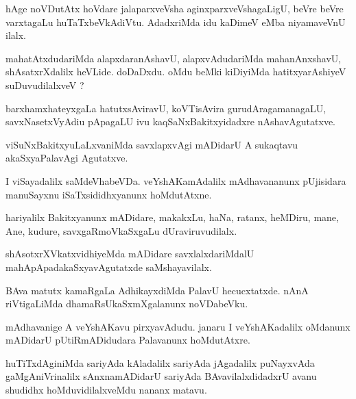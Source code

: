 \documentclass{article}
\begin{document}
\begin{mn}%
hAge noVDutAtx hoVdare jalaparxveVsha aginxparxveVshagaLigU, beVre beVre varxtagaLu 
huTaTxbeVkAdiVtu. AdadxriMda idu kaDimeV eMba niyamaveVnU ilalx.
\end{mn}

\begin{mn}%
mahatAtxdudariMda alapxdaranAshavU, alapxvAdudariMda mahanAnxshavU, shAsatxrXdalilx 
heVLide. doDaDxdu. oMdu beMki kiDiyiMda hatitxyarAshiyeV suDuvudilalxveV ?
\end{mn}

\begin{mn}%
barxhamxhateyxgaLa hatutxsAviravU, koVTisAvira gurudAragamanagaLU, savxNasetxVyAdiu 
pApagaLU ivu kaqSaNxBakitxyidadxre nAshavAgutatxve.
\end{mn}

\begin{mn}%
viSuNxBakitxyuLaLxvaniMda savxlapxvAgi mADidarU A sukaqtavu akaSxyaPalavAgi Agutatxve.
\end{mn}

\begin{mn}%
I viSayadalilx saMdeVhabeVDa. veYshAKamAdalilx mAdhavananunx pUjisidara manuSayxnu 
iSaTxsididhxyanunx hoMdutAtxne.
\end{mn}

\begin{mn}%
hariyalilx Bakitxyanunx mADidare, makakxLu, haNa, ratanx, heMDiru, mane, Ane, kudure, 
savxgaRmoVkaSxgaLu dUraviruvudilalx.
\end{mn}

\begin{mn}%
shAsotxrXVkatxvidhiyeMda mADidare savxlalxdariMdalU mahApApadakaSxyavAgutatxde 
saMshayavilalx.
\end{mn}

\begin{mn}%
BAva matutx kamaRgaLa AdhikayxdiMda PalavU hecucxtatxde. nAnA riVtigaLiMda 
dhamaRsUkaSxmXgalanunx noVDabeVku.
\end{mn}

\begin{mn}%
mAdhavanige A veYshAKavu pirxyavAdudu. janaru I veYshAKadalilx oMdanunx mADidarU 
pUtiRmADidudara Palavanunx hoMdutAtxre.
\end{mn}

\begin{mn}%
huTiTxdAginiMda sariyAda kAladalilx sariyAda jAgadalilx puNayxvAda gaMgAniVrinalilx 
sAnxnamADidarU sariyAda BAvavilalxdidadxrU avanu shudidhx hoMduvidilalxveMdu nananx matavu.
\end{mn}
\end{document}
